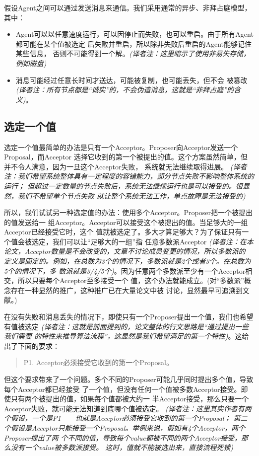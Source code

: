 假设Agent之间可以通过发送消息来通信。我们采用通常的异步、非拜占庭模型，其中：

\begin{itemize}
\item Agent可以以任意速度运行，可以因停止而失败，也可以重启。由于所有Agent都可能在某个值被选定
后失败并重启，所以除非失败后重启的Agent能够记住某些信息，
否则不可能得到一个解。\emph{(译者注：这里暗示了使用非易失存储，例如磁盘)}
\item 消息可能经过任意长时间才送达，可能被复制，也可能丢失，但不会
被篡改\emph{(译者注：所有节点都是“诚实”的，不会伪造消息，这就是“非拜占庭”的含义)}。
\end{itemize}

\subsection{选定一个值}
选定一个值最简单的办法是只有一个Acceptor。Proposer向Acceptor发送一个Proposal，而Acceptor
选择它收到的第一个被提出的值。这个方案虽然简单，但并不令人满意，因为一旦这个Acceptor失败，
系统就无法继续取得进展。
\emph{(译者注：我们希望系统整体具有一定程度的容错能力，部分节点失败不影响整体系统的运行；
但超过一定数量的节点失败后，系统无法继续运行也是可以接受的。很显然，我们不希望单个节点失败
就让整个系统无法工作，单点故障是无法接受的)}

所以，我们试试另一种选定值的办法：使用多个Acceptor。Proposer把一个被提出的值发送给一
组Acceptor。Acceptor可以接受这个被提出的值。当足够大的一组Acceptor已经接受它时，这个
值就被选定了。多大才算足够大？为了保证只有一个值会被选定，我们可以让“足够大的一组”指
任意多数派Acceptor
\emph{(译者注：在本论文，Acceptor数量是不会改变的，文章不讨论成员变更的情况，所以多数派的
定义是固定的。例如，在总数为3个的情况下，多数派就是2个或者3个。在总数为5个的情况下，多
数派就是3/4/5个)}。因为任意两个多数派至少有一个Acceptor相交，所以只要每个Acceptor至多接受一个
值，这个办法就能成立。(对“多数派”概念存在一种显然的推广，这种推广已在大量论文中被
讨论，显然最早可追溯到文献\cite{lamport1978implementation}。)

在没有失败和消息丢失的情况下，即使只有一个Proposer提出一个值，我们也希望有值被选定
\emph{(译者注：这就是前面提到的，论文整体的行文思路是“通过提出一些我们需要
的特性来推导算法流程”，这显然是我们希望满足的第一个特性)}。这给出了下面的要求：

\begin{quote}
P1. Acceptor必须接受它收到的第一个Proposal。
\end{quote}

但这个要求带来了一个问题。多个不同的Proposer可能几乎同时提出多个值，导致每个Acceptor都已经接受
了一个值，但没有任何一个值被多数Acceptor接受。即使只有两个被提出的值，如果每个值都被大约一
半Acceptor接受，那么只要一个Acceptor失败，就可能无法知道到底哪个值被选定。
\emph{(译者注：这里其实作者有两个假设，一个是P1——也就是Acceptor必须接受它收到的第一个Proposal；
第二个假设是Acceptor只能接受一个Proposal。举例来说，假如有4个Acceptor，两个Proposer提出了两
个不同的值，导致每个value都被不同的两个Acceptor接受，那么没有一个value被多数派接受。
这时，值就不能被选出来，直接流程死锁)}

